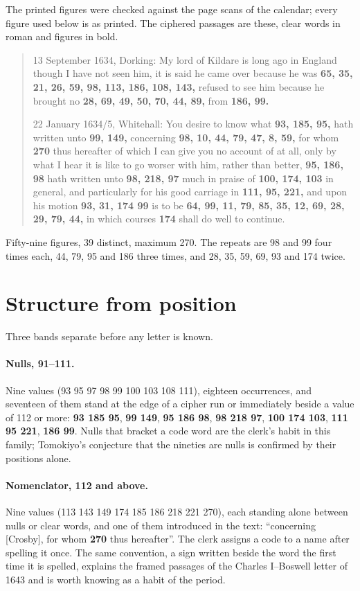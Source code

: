 \documentclass[11pt]{article}
\begin{document}
The printed figures were checked against the page scans of the calendar; every figure used below is as printed. The ciphered passages are these, clear words in roman and figures in bold.

\begin{quote}\small
13 September 1634, Dorking: My lord of Kildare is long ago in England though I have not seen him, it is said he came over because he was \textbf{65, 35, 21, 26, 59, 98, 113, 186, 108, 143,} refused to see him because he brought no \textbf{28, 69, 49, 50, 70, 44, 89,} from \textbf{186, 99.}

22 January 1634/5, Whitehall: You desire to know what \textbf{93, 185, 95,} hath written unto \textbf{99, 149,} concerning \textbf{98, 10, 44, 79, 47, 8, 59,} for whom \textbf{270} thus hereafter of which I can give you no account of at all, only by what I hear it is like to go worser with him, rather than better, \textbf{95, 186, 98} hath written unto \textbf{98, 218, 97} much in praise of \textbf{100, 174, 103} in general, and particularly for his good carriage in \textbf{111, 95, 221,} and upon his motion \textbf{93, 31, 174 99} is to be \textbf{64, 99, 11, 79, 85, 35, 12, 69, 28, 29, 79, 44,} in which courses \textbf{174} shall do well to continue.
\end{quote}

Fifty-nine figures, 39 distinct, maximum 270. The repeats are 98 and 99 four times each, 44, 79, 95 and 186 three times, and 28, 35, 59, 69, 93 and 174 twice.

\section{Structure from position}

Three bands separate before any letter is known.

\paragraph{Nulls, 91--111.} Nine values (93 95 97 98 99 100 103 108 111), eighteen occurrences, and seventeen of them stand at the edge of a cipher run or immediately beside a value of 112 or more: \textbf{93 185 95}, \textbf{99 149}, \textbf{95 186 98}, \textbf{98 218 97}, \textbf{100 174 103}, \textbf{111 95 221}, \textbf{186 99}. Nulls that bracket a code word are the clerk's habit in this family; Tomokiyo's conjecture that the nineties are nulls is confirmed by their positions alone.

\paragraph{Nomenclator, 112 and above.} Nine values (113 143 149 174 185 186 218 221 270), each standing alone between nulls or clear words, and one of them introduced in the text: ``concerning [Crosby], for whom \textbf{270} thus hereafter''. The clerk assigns a code to a name after spelling it once. The same convention, a sign written beside the word the first time it is spelled, explains the framed passages of the Charles I--Boswell letter of 1643 and is worth knowing as a habit of the period.
\end{document}
